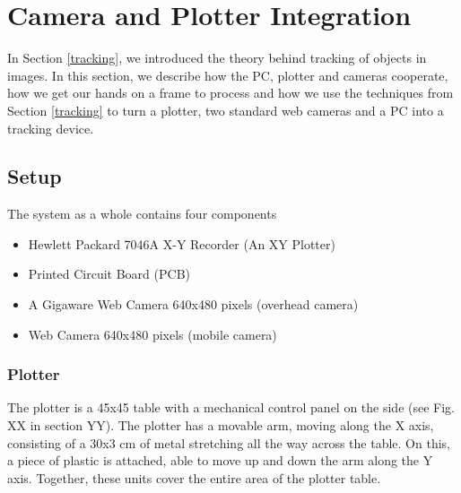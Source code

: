 
\section{Camera and Plotter Integration}


In Section \ref{tracking}, we introduced the theory behind tracking of objects in images. In this section, we describe how the PC, plotter and cameras cooperate, how we get our hands on a frame to process and how we use the techniques from Section \ref{tracking} to turn a plotter, two standard web cameras and a PC into a tracking device.

\subsection{Setup}

The system as a whole contains four components

\begin{itemize}
  \item Hewlett Packard 7046A X-Y Recorder (An XY Plotter)
  \item Printed Circuit Board (PCB)
  \item A Gigaware Web Camera 640x480 pixels (overhead camera)
  \item Web Camera 640x480 pixels (mobile camera)
\end{itemize}

\subsubsection{Plotter}
The plotter is a 45x45 table with a mechanical control panel on the side (see Fig. XX in section YY). The plotter has a movable arm, moving along the X axis, consisting of a 30x3 cm of metal stretching all the way across the table. On this, a piece of plastic is attached, able to move up and down the arm along the Y axis. Together, these units cover the entire area of the plotter table. \\

